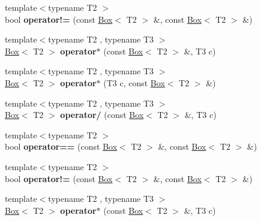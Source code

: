 \begin{DoxyCompactItemize}
\item 
\hypertarget{class_box_a5036b46321a1cf15710571b4f5e2a6e6}{
{\footnotesize template$<$typename T2 $>$ }\\bool {\bfseries operator!=} (const \hyperlink{class_box}{Box}$<$ T2 $>$ \&, const \hyperlink{class_box}{Box}$<$ T2 $>$ \&)}
\label{class_box_a5036b46321a1cf15710571b4f5e2a6e6}

\item 
\hypertarget{class_box_a9cc1a4474d25a4b472097480732acc93}{
{\footnotesize template$<$typename T2 , typename T3 $>$ }\\\hyperlink{class_box}{Box}$<$ T2 $>$ {\bfseries operator$\ast$} (const \hyperlink{class_box}{Box}$<$ T2 $>$ \&, T3 c)}
\label{class_box_a9cc1a4474d25a4b472097480732acc93}

\item 
\hypertarget{class_box_acb7a1088a3d15a5d0d515084854da7a6}{
{\footnotesize template$<$typename T2 , typename T3 $>$ }\\\hyperlink{class_box}{Box}$<$ T2 $>$ {\bfseries operator$\ast$} (T3 c, const \hyperlink{class_box}{Box}$<$ T2 $>$ \&)}
\label{class_box_acb7a1088a3d15a5d0d515084854da7a6}

\item 
\hypertarget{class_box_aa7ca8b98d5e0bee623683f0c8a70fda0}{
{\footnotesize template$<$typename T2 , typename T3 $>$ }\\\hyperlink{class_box}{Box}$<$ T2 $>$ {\bfseries operator/} (const \hyperlink{class_box}{Box}$<$ T2 $>$ \&, T3 c)}
\label{class_box_aa7ca8b98d5e0bee623683f0c8a70fda0}

\item 
\hypertarget{class_box_a6039a2c9a493ae6ba38deb18fd9e6ab1}{
{\footnotesize template$<$typename T2 $>$ }\\bool {\bfseries operator==} (const \hyperlink{class_box}{Box}$<$ T2 $>$ \&, const \hyperlink{class_box}{Box}$<$ T2 $>$ \&)}
\label{class_box_a6039a2c9a493ae6ba38deb18fd9e6ab1}

\item 
\hypertarget{class_box_a5036b46321a1cf15710571b4f5e2a6e6}{
{\footnotesize template$<$typename T2 $>$ }\\bool {\bfseries operator!=} (const \hyperlink{class_box}{Box}$<$ T2 $>$ \&, const \hyperlink{class_box}{Box}$<$ T2 $>$ \&)}
\label{class_box_a5036b46321a1cf15710571b4f5e2a6e6}

\item 
\hypertarget{class_box_a9cc1a4474d25a4b472097480732acc93}{
{\footnotesize template$<$typename T2 , typename T3 $>$ }\\\hyperlink{class_box}{Box}$<$ T2 $>$ {\bfseries operator$\ast$} (const \hyperlink{class_box}{Box}$<$ T2 $>$ \&, T3 c)}
\label{class_box_a9cc1a4474d25a4b472097480732acc93}


\end{DoxyCompactItemize}
